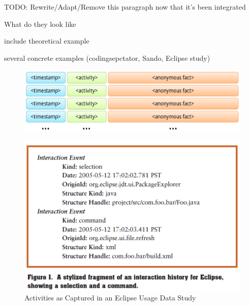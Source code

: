 TODO: Rewrite/Adapt/Remove this paragraph now that it's been integrated

What do they look like

include theoretical example

several concrete examples (codingsepctator, Sando, Eclipse study)




\begin{figure}[t]
 \centering
\includegraphics[width=1\columnwidth]{../Graphics/activityLogTheoretical.pdf}
\label{fig:theoretical}
\end{figure}



\begin{figure}[t]
 \centering
\includegraphics[width=0.5\columnwidth]{AnalyzingUsageData/activityEvent}
\caption{Activities as Captured in an Eclipse Usage Data Study}
\label{fig:activity}
\end{figure}

